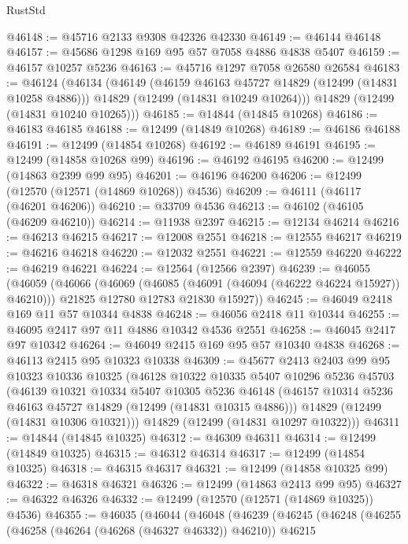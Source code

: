 \begin{lexlean}{RustStd}
\begin{coremodule}
{\begin{coremodule}
{{{{{{{{{{{{{{{{{{{{{{{{{{{{{{{{{{{{{{{{{{{{{{{{{{{{{{{{{{{{{{{{{{{{{{{{{{{{{{{{@46148 := @45716 @2133 @9308 @42326 @42330
@46149 := @46144 @46148
@46157 := @45686 @1298 @169 @95 @57 @7058 @4886 @4838 @5407
@46159 := @46157 @10257 @5236
@46163 := @45716 @1297 @7058 @26580 @26584
@46183 := @46124
    (@46134
      (@46149
        (@46159 @46163 @45727 @14829 (@12499 (@14831 @10258 @4886)))
        @14829
        (@12499 (@14831 @10249 @10264)))
      @14829
      (@12499 (@14831 @10240 @10265)))
@46185 := @14844 (@14845 @10268)
@46186 := @46183 @46185
@46188 := @12499 (@14849 @10268)
@46189 := @46186 @46188
@46191 := @12499 (@14854 @10268)
@46192 := @46189 @46191
@46195 := @12499 (@14858 @10268 @99)
@46196 := @46192 @46195
@46200 := @12499 (@14863 @2399 @99 @95)
@46201 := @46196 @46200
@46206 := @12499 (@12570 (@12571 (@14869 @10268)) @4536)
@46209 := @46111 (@46117 (@46201 @46206))
@46210 := @33709 @4536
@46213 := @46102 (@46105 (@46209 @46210))
@46214 := @11938 @2397
@46215 := @12134 @46214
@46216 := @46213 @46215
@46217 := @12008 @2551
@46218 := @12555 @46217
@46219 := @46216 @46218
@46220 := @12032 @2551
@46221 := @12559 @46220
@46222 := @46219 @46221
@46224 := @12564 (@12566 @2397)
@46239 := @46055
    (@46059
      (@46066
        (@46069 (@46085 (@46091 (@46094 (@46222 @46224 @15927)) @46210)))
        @21825
        @12780
        @12783
        @21830
        @15927))
@46245 := @46049 @2418 @169 @11 @57 @10344 @4838
@46248 := @46056 @2418 @11 @10344
@46255 := @46095 @2417 @97 @11 @4886 @10342 @4536 @2551
@46258 := @46045 @2417 @97 @10342
@46264 := @46049 @2415 @169 @95 @57 @10340 @4838
@46268 := @46113 @2415 @95 @10323 @10338
@46309 := @45677
    @2413
    @2403
    @99
    @95
    @10323
    @10336
    @10325
    (@46128
      @10322
      @10335
      @5407
      @10296
      @5236
      @45703
      (@46139
        @10321
        @10334
        @5407
        @10305
        @5236
        @46148
        (@46157 @10314 @5236 @46163 @45727 @14829 (@12499 (@14831 @10315 @4886)))
        @14829
        (@12499 (@14831 @10306 @10321)))
      @14829
      (@12499 (@14831 @10297 @10322)))
@46311 := @14844 (@14845 @10325)
@46312 := @46309 @46311
@46314 := @12499 (@14849 @10325)
@46315 := @46312 @46314
@46317 := @12499 (@14854 @10325)
@46318 := @46315 @46317
@46321 := @12499 (@14858 @10325 @99)
@46322 := @46318 @46321
@46326 := @12499 (@14863 @2413 @99 @95)
@46327 := @46322 @46326
@46332 := @12499 (@12570 (@12571 (@14869 @10325)) @4536)
@46355 := @46035
    (@46044
      (@46048
        (@46239
          (@46245
            (@46248
              (@46255
                (@46258 (@46264 (@46268 (@46327 @46332)) @46210))
                @46215
}}}}}}}}}}}}}}}}}}}}}}}}}}}}}}}}}}}}}}}}}}}}}}}}}}}}}}}}}}}}}}}}}}}}}}}}}}}}}}}}
\end{coremodule}}
\end{coremodule}
\end{lexlean}
